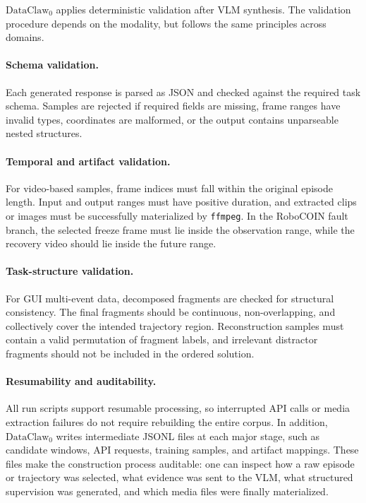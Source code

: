 $\text{DataClaw}_0$ applies deterministic validation after VLM synthesis. The validation procedure depends on the modality, but follows the same principles across domains.

\paragraph{Schema validation.}
Each generated response is parsed as JSON and checked against the required task schema. Samples are rejected if required fields are missing, frame ranges have invalid types, coordinates are malformed, or the output contains unparseable nested structures.

\paragraph{Temporal and artifact validation.}
For video-based samples, frame indices must fall within the original episode length. Input and output ranges must have positive duration, and extracted clips or images must be successfully materialized by \texttt{ffmpeg}. In the RoboCOIN fault branch, the selected freeze frame must lie inside the observation range, while the recovery video should lie inside the future range.

\paragraph{Task-structure validation.}
For GUI multi-event data, decomposed fragments are checked for structural consistency. The final fragments should be continuous, non-overlapping, and collectively cover the intended trajectory region. Reconstruction samples must contain a valid permutation of fragment labels, and irrelevant distractor fragments should not be included in the ordered solution.

\paragraph{Resumability and auditability.}
All run scripts support resumable processing, so interrupted API calls or media extraction failures do not require rebuilding the entire corpus. In addition, $\text{DataClaw}_0$ writes intermediate JSONL files at each major stage, such as candidate windows, API requests, training samples, and artifact mappings. These files make the construction process auditable: one can inspect how a raw episode or trajectory was selected, what evidence was sent to the VLM, what structured supervision was generated, and which media files were finally materialized.

